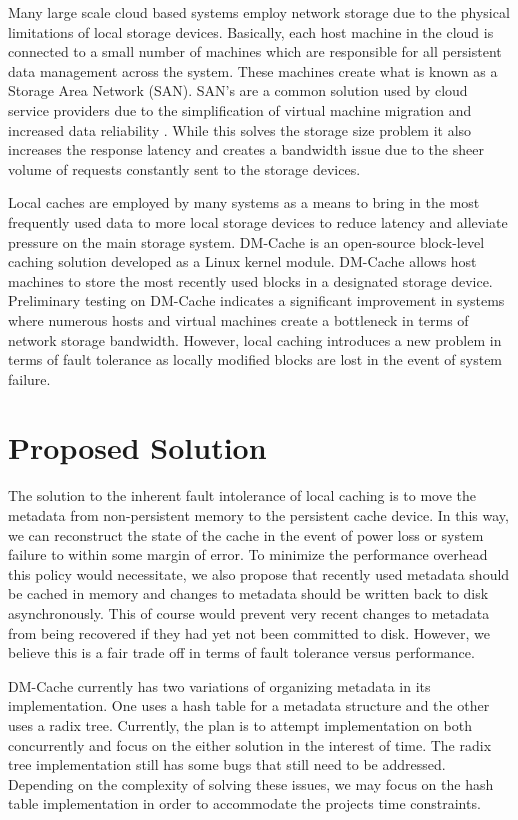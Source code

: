 \documentclass[letterpaper,12pt]{article}
\begin{document}
Many large scale cloud based systems employ network storage due to the
physical limitations of local storage devices. Basically, each host
machine in the cloud is connected to a small number of machines which
are responsible for all persistent data management across the system.
These machines create what is known as a Storage Area Network (SAN).
SAN's are a common solution used by cloud service providers due to the
simplification of virtual machine migration and increased data
reliability \cite{Datacenter}. While this solves the storage size
problem it also increases the response latency and creates a bandwidth
issue due to the sheer volume of requests constantly sent to the
storage devices.

Local caches are employed by many systems as a means to bring in the
most frequently used data to more local storage devices to reduce
latency and alleviate pressure on the main storage system. DM-Cache is
an open-source block-level caching solution developed as a Linux
kernel module. DM-Cache allows host machines to store the most
recently used blocks in a designated storage device. Preliminary
testing on DM-Cache indicates a significant improvement in systems
where numerous hosts and virtual machines create a bottleneck in terms
of network storage bandwidth. However, local caching introduces a new
problem in terms of fault tolerance as locally modified blocks are
lost in the event of system failure.


\section*{Proposed Solution}

The solution to the inherent fault intolerance of local caching is to
move the metadata from non-persistent memory to the persistent cache
device. In this way, we can reconstruct the state of the cache in the
event of power loss or system failure to within some margin of
error. To minimize the performance overhead this policy would
necessitate, we also propose that recently used metadata should be
cached in memory and changes to metadata should be written back to
disk asynchronously. This of course would prevent very recent changes
to metadata from being recovered if they had yet not been committed to
disk. However, we believe this is a fair trade off in terms of fault
tolerance versus performance.

DM-Cache currently has two variations of organizing metadata in its
implementation. One uses a hash table for a metadata structure and the
other uses a radix tree. Currently, the plan is to attempt
implementation on both concurrently and focus on the either solution
in the interest of time. The radix tree implementation still has some
bugs that still need to be addressed. Depending on the complexity of
solving these issues, we may focus on the hash table implementation in
order to accommodate the projects time constraints.
\end{document}
